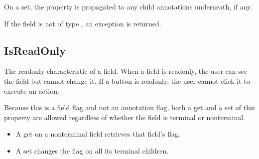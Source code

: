 \documentclass[letterpaper,12pt,english,openany,oneside]{sphinxmanual}
\begin{document}
On a set, the property is propagated to any child annotations underneath, if any.

\label{\detokenize{IAC_API_FormsIntro:syntax-21}}

\begin{sphinxVerbatim}[commandchars=\\\{\}]
\PYG{p}{[}\PYG{p}{]} 
\end{sphinxVerbatim}
\label{\detokenize{IAC_API_FormsIntro:exceptions-13}}

If the field is not of type , an exception  is returned.

\label{\detokenize{IAC_API_FormsIntro:example-15}}

\begin{sphinxVerbatim}[commandchars=\\\{\}]
  
\end{sphinxVerbatim}




\subsection{IsReadOnly}
\label{\detokenize{IAC_API_FormsIntro:isreadonly}}
The read\sphinxhyphen{}only characteristic of a field. When a field is read\sphinxhyphen{}only, the user can see the field but cannot change it. If a button is read\sphinxhyphen{}only, the user cannot click it to execute an action.

Because this is a field flag and not an annotation flag, both a get and a set of this property are allowed regardless of whether the field is terminal or non\sphinxhyphen{}terminal.
\begin{itemize}
\item {} 
A get on a non\sphinxhyphen{}terminal field retrieves that field’s flag.

\item {} 
A set changes the flag on all its terminal children.

\end{itemize}
\label{\detokenize{IAC_API_FormsIntro:syntax-22}}

\begin{sphinxVerbatim}[commandchars=\\\{\}]
\PYG{p}{[}\PYG{p}{]} 
\end{sphinxVerbatim}
\end{document}
